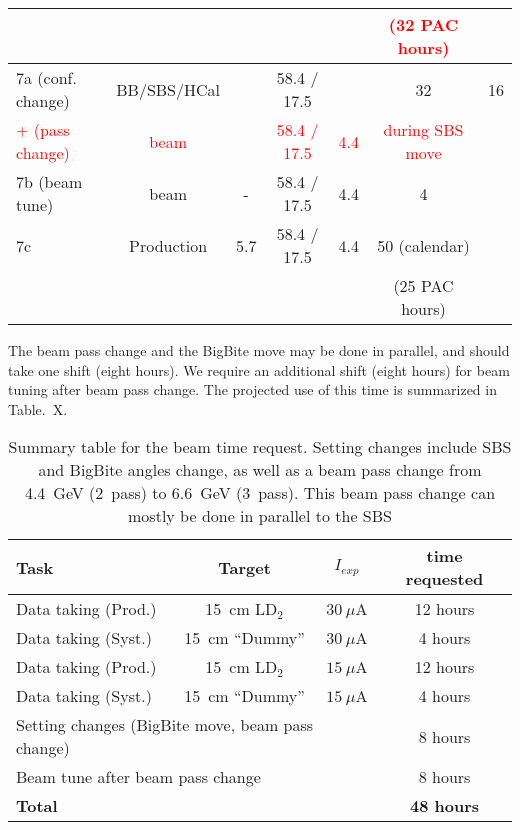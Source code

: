\begin{table}[h]
\begin{tabular}{|l|c|c|c|c|c|c|}
&  &  &  &  & \textcolor{red}{(32 PAC hours)} &  \\
\hline
\hline
7a (conf. change) & BB/SBS/HCal &  & 58.4 / 17.5 &  & 32 & 16 \\
\textcolor{red}{+ (pass change)} &  \textcolor{red}{beam} &  & \textcolor{red}{58.4 / 17.5} & \textcolor{red}{4.4} & \textcolor{red}{during SBS move} & \\
7b (beam tune) & beam & - & 58.4 / 17.5 & 4.4 & 4 &  \\
7c  & Production & 5.7 & 58.4 / 17.5 & 4.4 & 50 (calendar) &  \\
 &  &  &  &  & (25 PAC hours) &  \\
\hline
\end{tabular} 
\end{table}
%
The beam pass change and the BigBite move may be done in parallel, and should take one shift (eight hours). We require an additional shift (eight hours) for beam tuning after beam pass change. 
The projected use of this time is summarized in Table.~X.%
%
\begin{table}[h]
\caption{Summary table for the beam time request. Setting changes include SBS and BigBite angles change, as well as a beam pass change from 4.4~GeV (2~pass) to 6.6~GeV (3~pass). This beam pass change can mostly be done in parallel to the SBS}
\label{tab:beamtime}
\centering
\begin{tabular}{|l|c|c|c|}
\hline
Task & Target & $I_{exp}$ & time requested \\
\hline
Data taking (Prod.) & 15~cm LD$_2$ & $30~\mu$A & 12 hours \\ 
\hline
Data taking (Syst.) & 15~cm ``Dummy'' & $30~\mu$A & 4 hours \\ 
\hline
Data taking (Prod.) & 15~cm LD$_2$ & $15~\mu$A & 12 hours \\ 
\hline
Data taking (Syst.) & 15~cm ``Dummy'' & $15~\mu$A & 4 hours \\ 
\hline
\multicolumn{3}{|l|}{Setting changes (BigBite move, beam pass change)} & 8 hours \\
\multicolumn{3}{|l|}{Beam tune after beam pass change} & 8 hours \\
\hline
\hline
\multicolumn{3}{|l|}{\bf Total} & {\bf 48 hours} \\ 
\hline
\end{tabular} 
\end{table}

